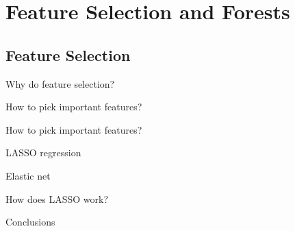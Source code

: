 \section{Feature Selection and Forests}
\subsection{Feature Selection}
\begin{frame}[t]{Why do feature selection?}

\end{frame}
\begin{frame}[t]{How to pick important features?}

\end{frame}
\begin{frame}[t]{How to pick important features?}

\end{frame}
\begin{frame}[t]{LASSO regression}

\end{frame}
\begin{frame}[t]{Elastic net}

\end{frame}
\begin{frame}[t]{How does LASSO work?}

\end{frame}
\begin{frame}[t]{Conclusions}

\end{frame}
